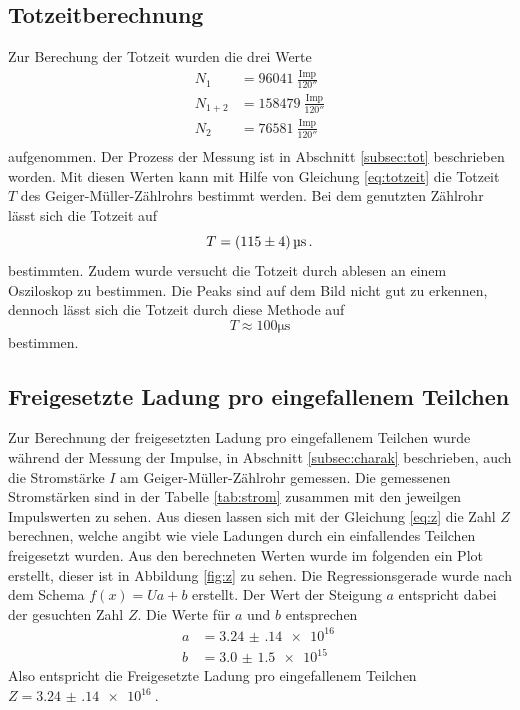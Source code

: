 \subsection{Totzeitberechnung}
Zur Berechung der Totzeit wurden die drei Werte
\begin{align*}
  N_1 &= \SI{96041}{\frac{\text{Imp}}{120\second}} \\
  N_{1+2} &= \SI{158479}{\frac{\text{Imp}}{120\second}} \\
  N_2 &= \SI{76581}{\frac{\text{Imp}}{120\second}} \\
  \label{eq:tot}
\end{align*}
aufgenommen.
Der Prozess der Messung ist in Abschnitt \ref{subsec:tot} beschrieben worden.
Mit diesen Werten kann mit Hilfe von Gleichung \eqref{eq:totzeit} die Totzeit $T$ des Geiger-Müller-Zählrohrs bestimmt werden.
Bei dem genutzten Zählrohr lässt sich die Totzeit auf 
\begin{equation*}
    T = \SI{115+-4}{\micro\second} \, .
\end{equation*}
bestimmten.
Zudem wurde versucht die Totzeit durch ablesen an einem Osziloskop zu bestimmen.
Die Peaks sind auf dem Bild nicht gut zu erkennen, dennoch lässt sich die Totzeit durch diese Methode auf
\begin{equation*}
  T \approx 100 \si{\micro\second}
\end{equation*}
bestimmen.
\FloatBarrier
\subsection{Freigesetzte Ladung pro eingefallenem Teilchen}
Zur Berechnung der freigesetzten Ladung pro eingefallenem Teilchen wurde während der Messung der Impulse, in Abschnitt \ref{subsec:charak} beschrieben, auch die Stromstärke $I$ am Geiger-Müller-Zählrohr gemessen.
Die gemessenen Stromstärken sind in der Tabelle \ref{tab:strom} zusammen mit den jeweilgen Impulswerten zu sehen.
Aus diesen lassen sich mit der Gleichung \eqref{eq:z} die Zahl $Z$ berechnen, welche angibt wie viele Ladungen durch ein einfallendes Teilchen freigesetzt wurden.
Aus den berechneten Werten wurde im folgenden ein Plot erstellt, dieser ist in Abbildung \ref{fig:z} zu sehen.
Die Regressionsgerade wurde nach dem Schema $f(x)=Ua+b$ erstellt.
Der Wert der Steigung $a$ entspricht dabei der gesuchten Zahl $Z$.
Die Werte für $a$ und $b$ entsprechen
\begin{align*}
  a &= \SI{3.24(14)e+16}{} \\
  b &= \SI{3.0(15)e+15}{}
\end{align*}
Also entspricht die Freigesetzte Ladung pro eingefallenem Teilchen $Z = \SI{3.24(14)e+16}{}$.

